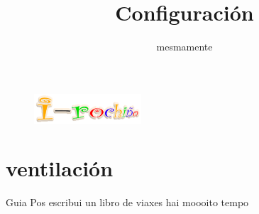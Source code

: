 \documentclass[11pt]{amsart}
\title{Configuración }		%
\author{mesmamente} 	%
\begin{document}
\begin{figure}[ht]
	\raggedright
	\includegraphics[width=4cm]{i-rocho.png}
\end{figure}

\maketitle %
\thispagestyle{empty} %


\section{ventilación}

\blindtext
\blindtext\blindtext\blindtext\blindtext\blindtext\blindtext






\clearpage\thispagestyle{empty}\null\newpage

\begin{thebibliography}{1}
 Guia
 Pos escribui un libro de viaxes hai moooito tempo 
\end{thebibliography}
\end{document}
